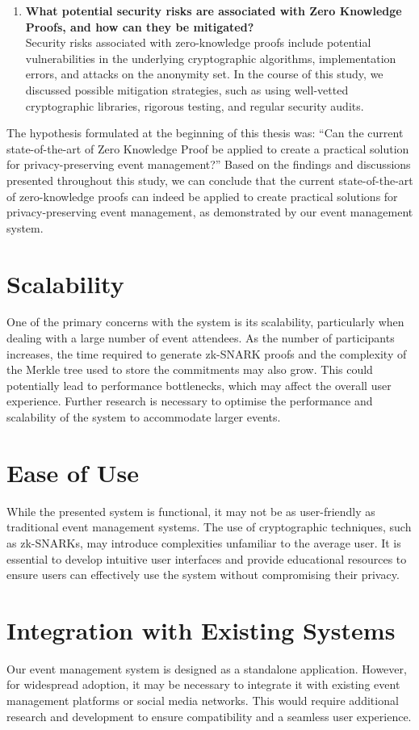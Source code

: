 \begin{enumerate}
\item \textbf{What potential security risks are associated with Zero Knowledge Proofs, and how can they be mitigated?}\\
Security risks associated with zero-knowledge proofs include potential vulnerabilities in the underlying cryptographic algorithms, implementation errors, and attacks on the anonymity set. In the course of this study, we discussed possible mitigation strategies, such as using well-vetted cryptographic libraries, rigorous testing, and regular security audits.

\end{enumerate}

The hypothesis formulated at the beginning of this thesis was: ``Can the current state-of-the-art of Zero Knowledge Proof be applied to create a practical solution for privacy-preserving event management?'' Based on the findings and discussions presented throughout this study, we can conclude that the current state-of-the-art of zero-knowledge proofs can indeed be applied to create practical solutions for privacy-preserving event management, as demonstrated by our event management system.

\section{Scalability}
One of the primary concerns with the system is its scalability, particularly when dealing with a large number of event attendees. As the number of participants increases, the time required to generate zk-SNARK proofs and the complexity of the Merkle tree used to store the commitments may also grow. This could potentially lead to performance bottlenecks, which may affect the overall user experience. Further research is necessary to optimise the performance and scalability of the system to accommodate larger events.

\section{Ease of Use}
While the presented system is functional, it may not be as user-friendly as traditional event management systems. The use of cryptographic techniques, such as zk-SNARKs, may introduce complexities unfamiliar to the average user. It is essential to develop intuitive user interfaces and provide educational resources to ensure users can effectively use the system without compromising their privacy.

\section{Integration with Existing Systems}
Our event management system is designed as a standalone application. However, for widespread adoption, it may be necessary to integrate it with existing event management platforms or social media networks. This would require additional research and development to ensure compatibility and a seamless user experience.

